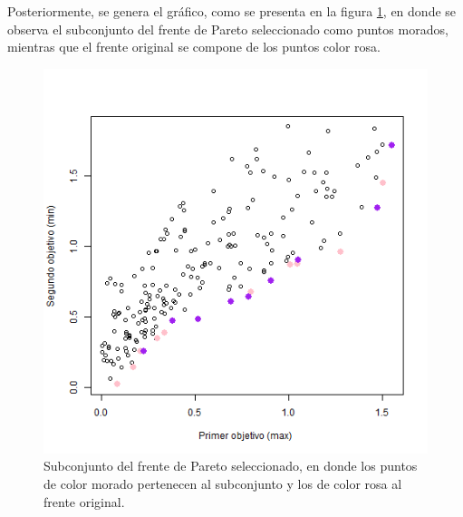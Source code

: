 \documentclass{article}
\begin{document}
Posteriormente, se genera el gráfico, como se presenta en la figura \ref{sub}, en donde se observa el subconjunto del frente de Pareto seleccionado como puntos morados, mientras que el frente original se compone de los puntos color rosa.

\begin{figure}[ptb]
\begin{center}
\includegraphics[width=\linewidth]{p11-sub.png}
\end{center}
\caption{Subconjunto del frente de Pareto seleccionado, en donde los puntos de color morado pertenecen al subconjunto y los de color rosa al frente original.\label{sub}}
\end{figure}



\end{document}
